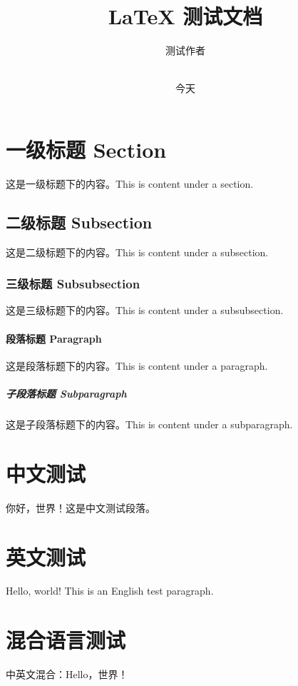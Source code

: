 \documentclass{article}
\title{LaTeX 测试文档}
\author{测试作者}
\date{\\今天}
\begin{document}
\section{一级标题 Section}
这是一级标题下的内容。This is content under a section.

\subsection{二级标题 Subsection}
这是二级标题下的内容。This is content under a subsection.

\subsubsection{三级标题 Subsubsection}
这是三级标题下的内容。This is content under a subsubsection.

\paragraph{段落标题 Paragraph}
这是段落标题下的内容。This is content under a paragraph.

\subparagraph{子段落标题 Subparagraph}
这是子段落标题下的内容。This is content under a subparagraph.

\section{中文测试}
你好，世界！这是中文测试段落。

\section{英文测试}
Hello, world! This is an English test paragraph.

\section{混合语言测试}
中英文混合：Hello，世界！
\end{document}
